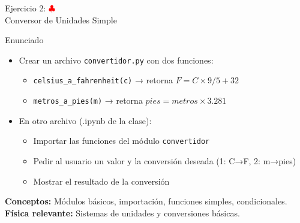 \documentclass[10pt]{beamer}
\begin{document}
\begin{frame}{Ejercicio 2: \hfill \textcolor{red}{$\clubsuit$} \\ Conversor de Unidades Simple}
  \begin{block}{Enunciado}
    \begin{itemize}
      \item Crear un archivo \texttt{convertidor.py} con dos funciones:
        \begin{itemize}
          \item \texttt{celsius\_a\_fahrenheit(c)} → retorna $F = C \times 9/5 + 32$
          \item \texttt{metros\_a\_pies(m)} → retorna $pies = metros \times 3.281$
        \end{itemize}
      \item En otro archivo (.ipynb de la clase):
        \begin{itemize}
          \item Importar las funciones del módulo \texttt{convertidor}
          \item Pedir al usuario un valor y la conversión deseada (1: C→F, 2: m→pies)
          \item Mostrar el resultado de la conversión
        \end{itemize}
    \end{itemize}
  \end{block}
  
  \textbf{Conceptos:} Módulos básicos, importación, funciones simples, condicionales.\\
  \textbf{Física relevante:} Sistemas de unidades y conversiones básicas.
\end{frame}
\end{document}
